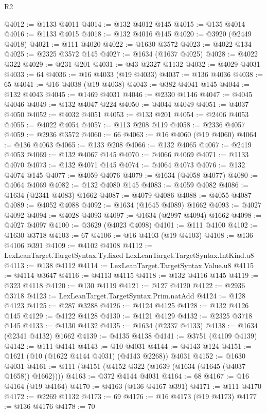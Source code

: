 \begin{lexlean}{R2}
\begin{coremodule}
@4012 := @1133 @4011
@4014 := @132 @4012 @145
@4015 := @135 @4014
@4016 := @1133 @4015
@4018 := @132 @4016 @145
@4020 := @3920 (@2449 @4018)
@4021 := @111 @4020
@4022 := @1630 @3572
@4023 := @4022 @134
@4025 := @2325 @3572 @145
@4027 := @1634 (@1637 @4025)
@4028 := @4022 @322
@4029 := @231 @201
@4031 := @43 @2327 @1132
@4032 := @4029 @4031
@4033 := 64
@4036 := @16 @4033 (@19 @4033)
@4037 := @136 @4036
@4038 := 65
@4041 := @16 @4038 (@19 @4038)
@4043 := @382 @4041 @145
@4044 := @132 @4043
@4045 := @1469 @4031
@4046 := @2330 @1146
@4047 := @4045 @4046
@4049 := @132 @4047 @224
@4050 := @4044 @4049
@4051 := @4037 @4050
@4052 := @4032 @4051
@4053 := @133 @201
@4054 := @2406 @4053
@4055 := @4022 @4054
@4057 := @113 @208 @119
@4058 := @2336 @4057
@4059 := @2936 @3572
@4060 := 66
@4063 := @16 @4060 (@19 @4060)
@4064 := @136 @4063
@4065 := @133 @208
@4066 := @132 @4065
@4067 := @2419 @4053
@4069 := @132 @4067 @145
@4070 := @4066 @4069
@4071 := @1133 @4070
@4073 := @132 @4071 @145
@4074 := @4064 @4073
@4076 := @132 @4074 @145
@4077 := @4059 @4076
@4079 := @1634 (@4058 @4077)
@4080 := @4064 @4069
@4082 := @132 @4080 @145
@4083 := @4059 @4082
@4086 := @1634 (@2341 @4083) @1662
@4087 := @4079 @4086
@4088 := @4055 @4087
@4089 := @4052 @4088
@4092 := @1634 (@1645 @4089) @1662
@4093 := @4027 @4092
@4094 := @4028 @4093
@4097 := @1634 (@2997 @4094) @1662
@4098 := @4027 @4097
@4100 := @3629 (@4023 @4098)
@4101 := @111 @4100
@4102 := @1630 @3718
@4103 := 67
@4106 := @16 @4103 (@19 @4103)
@4108 := @136 @4106 @391
@4109 := @4102 @4108
@4112 := LexLeanTarget.TargetSyntax.Ty.fixed LexLeanTarget.TargetSyntax.IntKind.u8
@4113 := @138 @4112
@4114 := LexLeanTarget.TargetSyntax.Value.u8
@4115 := @4114 @3647
@4116 := @4113 @4115
@4118 := @132 @4116 @145
@4119 := @323 @4118
@4120 := @130 @4119
@4121 := @127 @4120
@4122 := @2936 @3718
@4123 := LexLeanTarget.TargetSyntax.Prim.natAdd
@4124 := @128 @4123
@4125 := @287 @3288
@4126 := @4124 @4125
@4128 := @132 @4126 @145
@4129 := @4122 @4128
@4130 := @4121 @4129
@4132 := @2325 @3718 @145
@4133 := @4130 @4132
@4135 := @1634 (@2337 @4133)
@4138 := @1634 (@2341 @4132) @1662
@4139 := @4135 @4138
@4141 := @3751 (@4109 @4139)
@4142 := @111 @4141
@4143 := @10 @4031
@4144 := @4143 @124
@4151 := @1621 (@10 (@1622 @4144 @4031) (@4143 @2268)) @4031
@4152 := @1630 @4031
@4161 := @111 (@4151 (@4152 @322 (@1639 (@1634 (@1645 (@4037 @1658)) @1662))))
@4163 := @372 @4144 @4031
@4164 := 68
@4167 := @16 @4164 (@19 @4164)
@4170 := @4163 (@136 @4167 @391)
@4171 := @111 @4170
@4172 := @2269 @1132
@4173 := 69
@4176 := @16 @4173 (@19 @4173)
@4177 := @136 @4176
@4178 := 70

\end{coremodule}
\end{lexlean}
